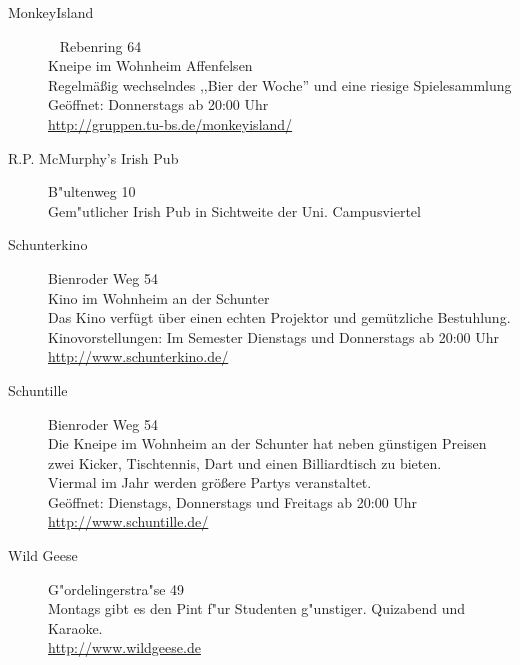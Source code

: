 \begin{multicols}{2}
\begin{description}
		\item[MonkeyIsland]~ \hfill Rebenring 64\\
		Kneipe im Wohnheim Affenfelsen\\
		Regelmäßig wechselndes ,,Bier der Woche'' und eine riesige
		Spielesammlung\\
		Geöffnet: Donnerstags ab 20:00 Uhr\\
		\url{http://gruppen.tu-bs.de/monkeyisland/}

		\item[R.P. McMurphy's Irish Pub] \hfill B"ultenweg 10\\
		Gem"utlicher Irish Pub in Sichtweite der Uni.
		Campusviertel
 
 		\item[Schunterkino] \small{Bienroder Weg 54}\\
	 	Kino im Wohnheim an der Schunter\\
	 	Das Kino verfügt über einen echten Projektor und gemützliche Bestuhlung.\\
		Kinovorstellungen: Im Semester Dienstags und Donnerstags ab 20:00 Uhr\\
		\url{http://www.schunterkino.de/}\\
 		
 		\item[Schuntille] \small{Bienroder Weg 54}\\
 		Die Kneipe im Wohnheim an der Schunter hat neben günstigen Preisen zwei Kicker, Tischtennis, Dart und einen Billiardtisch zu bieten.\\
	 	Viermal im Jahr werden größere Partys veranstaltet.\\
	 	Geöffnet: Dienstags, Donnerstags und Freitags ab 20:00 Uhr
	 	\url{http://www.schuntille.de/}
	
		\item[Wild Geese] \hfill G"ordelingerstra"se 49\\
		Montags gibt es den Pint f"ur Studenten g"unstiger.
		Quizabend und Karaoke.\\
		\url{http://www.wildgeese.de}
	\end{description}
\end{multicols}
